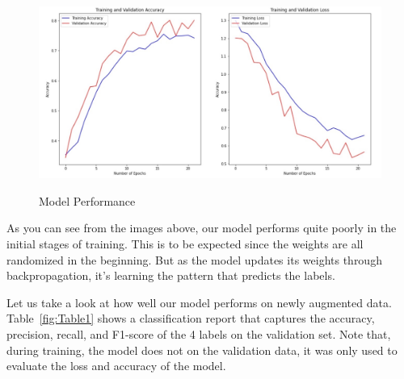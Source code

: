 \documentclass[man,floatsintext]{apa7}
\begin{document}
\begin{singlespace}
\begin{figure}
  \centering
  \caption{Model Performance}
  \includegraphics[width=1\textwidth]{images/image5.jpg}
  \label{fig:Figure5}
\end{figure}

As you can see from the images above, our model performs quite poorly in the initial stages of training. This is to be expected since the weights are all randomized in the beginning. But as the model updates its weights through backpropagation, it’s learning the pattern that predicts the labels.

Let us take a look at how well our model performs on newly augmented data. Table~\ref{fig:Table1} shows a classification report that captures the accuracy, precision, recall, and F1-score of the 4 labels on the validation set. Note that, during training, the model does not on the validation data, it was only used to evaluate the loss and accuracy of the model. 


\clearpage

\renewcommand{\arraystretch}{1.75}


\end{singlespace}
\end{document}
